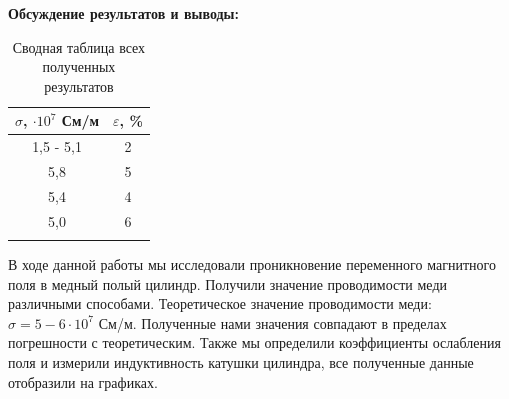 \documentclass[a4paper, 12pt]{article}%
\begin{document}
	
	
	\textbf{Обсуждение результатов и выводы: }\\
	
	\begin{longtable} {|c|c|}
		\hline
		$\sigma$, $\cdot 10^7$ См/м & $\varepsilon$, \% \\ \hline
		1,5 - 5,1 & 2 \\ \hline
		5,8 & 5 \\ \hline
		5,4 & 4 \\ \hline
		5,0 & 6 \\ \hline
		\caption{Сводная таблица всех полученных результатов}
	\end{longtable}
	
	В ходе данной работы мы исследовали проникновение переменного магнитного поля в медный полый цилиндр. Получили значение проводимости меди различными способами. Теоретическое значение проводимости меди: $\sigma = 5-6 \cdot 10^7$ См/м. Полученные нами значения совпадают в пределах погрешности с теоретическим. Также мы определили коэффициенты ослабления поля и измерили индуктивность катушки цилиндра, все полученные данные отобразили на графиках.
	
	
	
	
	
	
	
	
	
	
	
	
	
	
	
	
	
	
	
	
	
	
	
	
	
	
	
	
	
	
	
	
	
	
	
	
	
	
	
	
	
\end{document}
